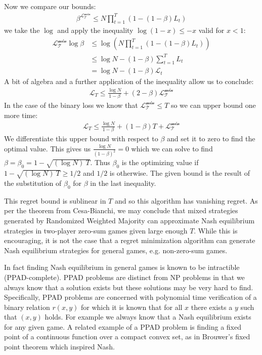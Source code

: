 \documentclass{article}
\begin{document}
Now we compare our bounds:
\begin{align*}
    \beta^\mathcal{L_T^\text{min}} \le N \prod_{t=1}^T (1-(1-\beta)L_t)
\end{align*}
\noindent we take the $\log$ and apply the inequality $\log(1-x) \le -x$ valid for $x<1$:
\begin{align*}
    \mathcal{L_T^\text{min}}\log\beta & \le \log\left(N \prod_{t=1}^T (1-(1-\beta)L_t)\right)\\
    & \le \log N - (1-\beta)\sum_{t=1}^T L_t\\
    & = \log N - (1-\beta) \mathcal{L}_t
\end{align*}
\noindent A bit of algebra and a further application of the inequality allow us to conclude:
\begin{align*}
\mathcal{L}_T \le \frac{\log N}{1-\beta} + (2-\beta)\mathcal{L_T^\text{min}}
\end{align*}
\noindent In the case of the binary loss we know that $\mathcal{L_T^\text{min}} \le T$ so we can upper bound one more time:
\begin{align*}
\mathcal{L}_T \le \frac{\log N}{1-\beta} + (1-\beta)T + \mathcal{L_T^\text{min}}
\end{align*}
\noindent We differentiate this upper bound with respect to $\beta$ and set it to zero to find the optimal value. This gives us $\frac{\log N}{(1-\beta)^2} = 0$ which we can solve to find $\beta = \beta_0 = 1 - \sqrt{(\log N)\ T}$. Thus $\beta_0$ is the optimizing value if $1 - \sqrt{(\log N)\ T} \ge 1/2$ and $1/2$ is otherwise. The given bound is the result of the substitution of $\beta_0$ for $\beta$ in the last inequality.

This regret bound is sublinear in $T$ and so this algorithm has vanishing regret. As per the theorem from Cesa-Bianchi\cite{cesa2006prediction}, we may conclude that mixed strategies generated by Randomized Weighted Majority can approximate Nash equilibrium strategies in two-player zero-sum games given large enough $T$. While this is encouraging, it is not the case that a regret minimization algorithm can generate Nash equilibrium strategies for general games, e.g. non-zero-sum games. 

In fact finding Nash equilibrium in general games is known to be intractible (PPAD-complete\cite{daskalakis2009complexity}). PPAD problems are distinct from NP problems in that we always know that a solution exists but these solutions may be very hard to find. Specifically, PPAD problems are concerned with polynomial time verification of a binary relation $r(x,y)$ for which it is known that for all $x$ there exists a $y$ such that $(x,y)$ holds. For example we always know that a Nash equilibrium exists for any given game. A related example of a PPAD problem is finding a fixed point of a continuous function over a compact convex set, as in Brouwer's fixed point theorem which inspired Nash.
\end{document}
